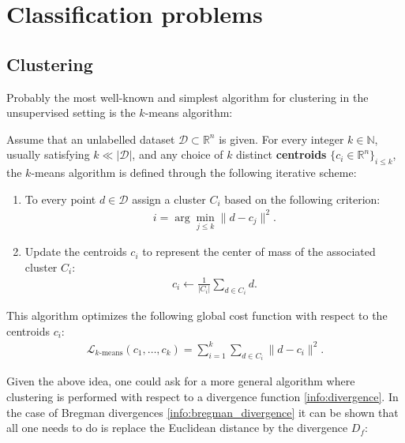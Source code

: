 \section{Classification problems}
\subsection{Clustering}

    Probably the most well-known and simplest algorithm for clustering in the unsupervised setting is the $k$-means algorithm:
    \begin{method}
        Assume that an unlabelled dataset $\mathcal{D}\subset\mathbb{R}^n$ is given. For every integer $k\in\mathbb{N}$, usually satisfying $k\ll|\mathcal{D}|$, and any choice of $k$ distinct \textbf{centroids} $\{c_i\in\mathbb{R}^n\}_{i\leq k}$, the $k$-means algorithm is defined through the following iterative scheme:
        \begin{enumerate}
            \item To every point $d\in\mathcal{D}$ assign a cluster $C_i$ based on the following criterion:
            \begin{gather}
                i = \arg\min_{j\leq k}\|d-c_j\|^2.
            \end{gather}
            \item Update the centroids $c_i$ to represent the center of mass of the associated cluster $C_i$:
            \begin{gather}
                c_i\longleftarrow\frac{1}{|C_i|}\sum_{d\in C_i}d.
            \end{gather}
        \end{enumerate}
        This algorithm optimizes the following global cost function with respect to the centroids $c_i$:
        \begin{gather}
            \mathcal{L}_{k\text{-means}}(c_1,\ldots,c_k) = \sum_{i=1}^k\sum_{d\in C_i}\|d - c_i\|^2.
        \end{gather}
    \end{method}
    Given the above idea, one could ask for a more general algorithm where clustering is performed with respect to a divergence function \ref{info:divergence}. In the case of Bregman divergences \ref{info:bregman_divergence} it can be shown that all one needs to do is replace the Euclidean distance by the divergence $D_f$:
